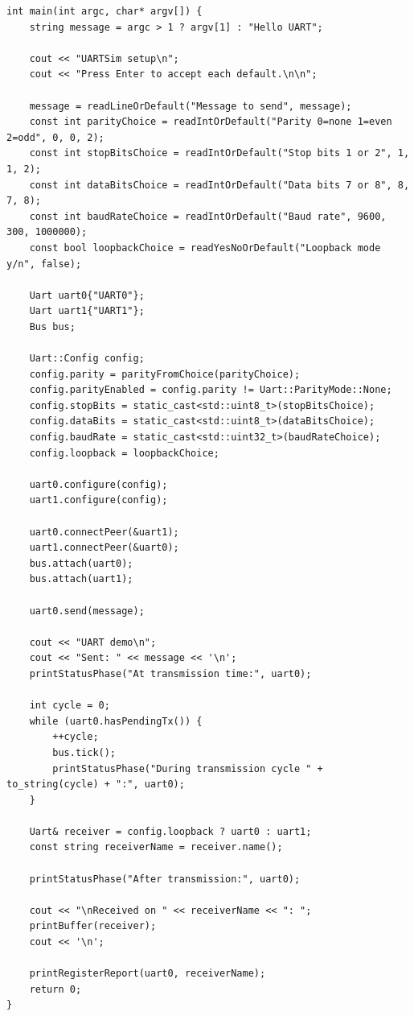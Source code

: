 \documentclass[11pt]{article}
\begin{document}
\begin{lstlisting}[style=code]
int main(int argc, char* argv[]) {
    string message = argc > 1 ? argv[1] : "Hello UART";

    cout << "UARTSim setup\n";
    cout << "Press Enter to accept each default.\n\n";

    message = readLineOrDefault("Message to send", message);
    const int parityChoice = readIntOrDefault("Parity 0=none 1=even 2=odd", 0, 0, 2);
    const int stopBitsChoice = readIntOrDefault("Stop bits 1 or 2", 1, 1, 2);
    const int dataBitsChoice = readIntOrDefault("Data bits 7 or 8", 8, 7, 8);
    const int baudRateChoice = readIntOrDefault("Baud rate", 9600, 300, 1000000);
    const bool loopbackChoice = readYesNoOrDefault("Loopback mode y/n", false);

    Uart uart0{"UART0"};
    Uart uart1{"UART1"};
    Bus bus;

    Uart::Config config;
    config.parity = parityFromChoice(parityChoice);
    config.parityEnabled = config.parity != Uart::ParityMode::None;
    config.stopBits = static_cast<std::uint8_t>(stopBitsChoice);
    config.dataBits = static_cast<std::uint8_t>(dataBitsChoice);
    config.baudRate = static_cast<std::uint32_t>(baudRateChoice);
    config.loopback = loopbackChoice;

    uart0.configure(config);
    uart1.configure(config);

    uart0.connectPeer(&uart1);
    uart1.connectPeer(&uart0);
    bus.attach(uart0);
    bus.attach(uart1);

    uart0.send(message);

    cout << "UART demo\n";
    cout << "Sent: " << message << '\n';
    printStatusPhase("At transmission time:", uart0);

    int cycle = 0;
    while (uart0.hasPendingTx()) {
        ++cycle;
        bus.tick();
        printStatusPhase("During transmission cycle " + to_string(cycle) + ":", uart0);
    }

    Uart& receiver = config.loopback ? uart0 : uart1;
    const string receiverName = receiver.name();

    printStatusPhase("After transmission:", uart0);

    cout << "\nReceived on " << receiverName << ": ";
    printBuffer(receiver);
    cout << '\n';

    printRegisterReport(uart0, receiverName);
    return 0;
}
\end{lstlisting}
\end{document}
